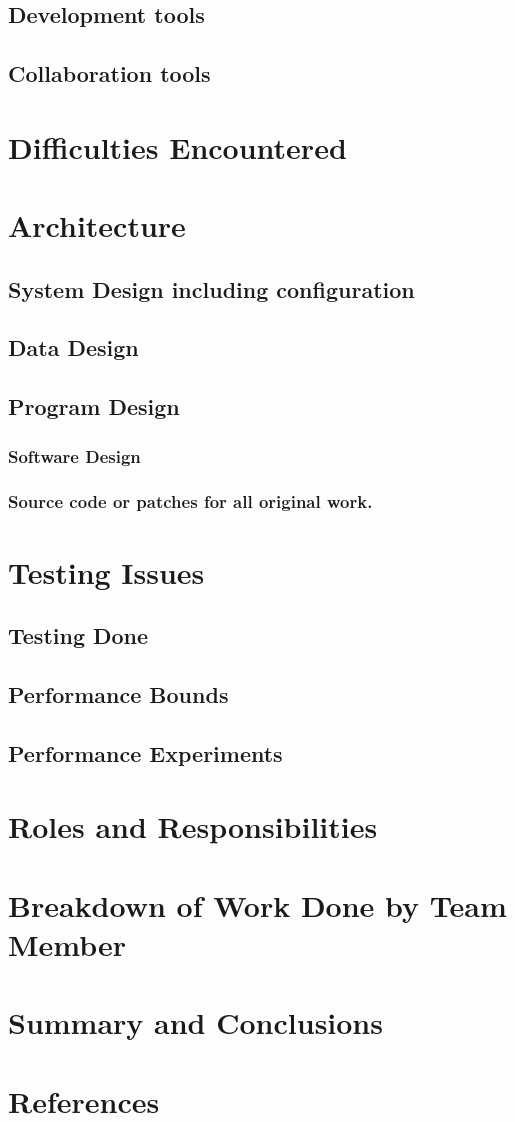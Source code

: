 \documentclass[11pt,a4paper,titlepage]{report}
\begin{document}
\subsection{Development tools}
\subsection{Collaboration tools}
\section{Difficulties Encountered}
\section{Architecture}
\subsection{System Design including configuration}
\subsection{Data Design}
\subsection{Program Design}
\subsubsection{Software Design}
\subsubsection{Source code or patches for all original work.}
\section{Testing Issues}
\subsection{Testing Done}
\subsection{Performance Bounds}
\subsection{Performance Experiments}
\section{Roles and Responsibilities}
\section{Breakdown of Work Done by Team Member}
\section{Summary and Conclusions}
\section{References}



\begin{appendices}
\end{appendices}

\nocite{*}
\printbibliography[heading=bibintoc]
\end{document}
